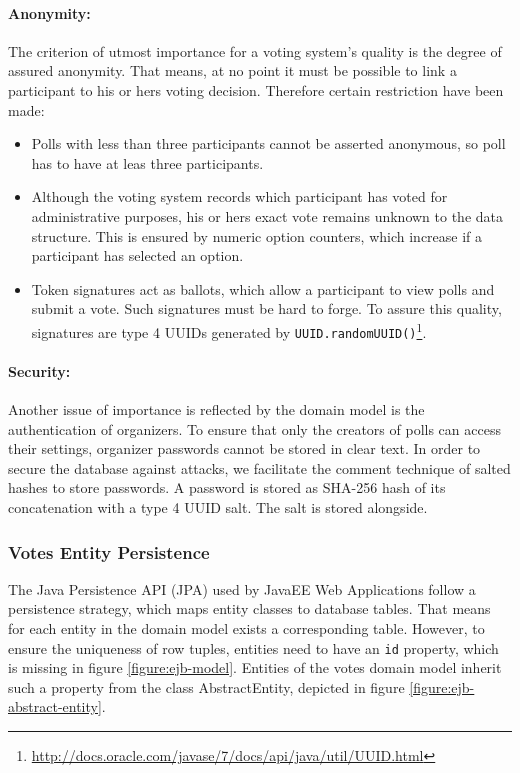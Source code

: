 \paragraph{Anonymity:}
The criterion of utmost importance for a voting system's quality is the degree of assured anonymity.
That means, at no point it must be possible to link a participant to his or hers voting decision.
Therefore certain restriction have been made:
\begin{itemize}

\item
Polls with less than three participants cannot be asserted anonymous, so poll has to have at leas three participants.

\item
Although the voting system records which participant has voted for administrative purposes, his or hers exact vote remains unknown to the data structure.
This is ensured by numeric option counters, which increase if a participant has selected an option.

\item
Token signatures act as ballots, which allow a participant to view polls and submit a vote. 
Such signatures must be hard to forge.
To assure this quality, signatures are type 4 UUIDs generated by \texttt{UUID.randomUUID()}\footnote{\url{http://docs.oracle.com/javase/7/docs/api/java/util/UUID.html}}.

\end{itemize}


\paragraph{Security:}
Another issue of importance is reflected by the domain model is the authentication of organizers.
To ensure that only the creators of polls can access their settings, organizer passwords cannot be stored in clear text.
In order to secure the database against attacks, we facilitate the comment technique of salted hashes to store passwords.
A password is stored as SHA-256 hash of its concatenation with a type 4 UUID salt.
The salt is stored alongside.


\subsubsection{Votes Entity Persistence}
\label{subsubsec:votes-entity-persistence}
The Java Persistence API (JPA) used by JavaEE Web Applications follow a persistence strategy, which maps entity classes to database tables.
That means for each entity in the domain model exists a corresponding table.
However, to ensure the uniqueness of row tuples, entities need to have an \texttt{id} property, which is missing in figure \ref{figure:ejb-model}.
Entities of the votes domain model inherit such a property from the class AbstractEntity, depicted in figure \ref{figure:ejb-abstract-entity}.

